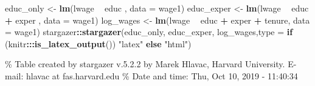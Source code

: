 \documentclass[]{book}
\newenvironment{Shaded}{\begin{snugshade}}{\end{snugshade}}
\newcommand{\ControlFlowTok}[1]{\textcolor[rgb]{0.13,0.29,0.53}{\textbf{#1}}}
\newcommand{\DataTypeTok}[1]{\textcolor[rgb]{0.13,0.29,0.53}{#1}}
\newcommand{\KeywordTok}[1]{\textcolor[rgb]{0.13,0.29,0.53}{\textbf{#1}}}
\newcommand{\NormalTok}[1]{#1}
\newcommand{\OperatorTok}[1]{\textcolor[rgb]{0.81,0.36,0.00}{\textbf{#1}}}
\newcommand{\StringTok}[1]{\textcolor[rgb]{0.31,0.60,0.02}{#1}}
\begin{document}
\begin{Shaded}
\begin{Highlighting}[]
\NormalTok{educ_only <-}\StringTok{ }\KeywordTok{lm}\NormalTok{(lwage }\OperatorTok{~}\StringTok{ }\NormalTok{educ                 , }\DataTypeTok{data =}\NormalTok{ wage1)}
\NormalTok{educ_exper <-}\StringTok{ }\KeywordTok{lm}\NormalTok{(lwage }\OperatorTok{~}\StringTok{ }\NormalTok{educ }\OperatorTok{+}\StringTok{ }\NormalTok{exper        , }\DataTypeTok{data =}\NormalTok{ wage1)}
\NormalTok{log_wages <-}\StringTok{ }\KeywordTok{lm}\NormalTok{(lwage }\OperatorTok{~}\StringTok{ }\NormalTok{educ }\OperatorTok{+}\StringTok{ }\NormalTok{exper }\OperatorTok{+}\StringTok{ }\NormalTok{tenure, }\DataTypeTok{data =}\NormalTok{ wage1)}
\NormalTok{stargazer}\OperatorTok{::}\KeywordTok{stargazer}\NormalTok{(educ_only, educ_exper, log_wages,}\DataTypeTok{type =} \ControlFlowTok{if}\NormalTok{ (knitr}\OperatorTok{:::}\KeywordTok{is_latex_output}\NormalTok{()) }\StringTok{"latex"} \ControlFlowTok{else} \StringTok{"html"}\NormalTok{)}
\end{Highlighting}
\end{Shaded}

\% Table created by stargazer v.5.2.2 by Marek Hlavac, Harvard University. E-mail: hlavac at fas.harvard.edu
\% Date and time: Thu, Oct 10, 2019 - 11:40:34
\end{document}
